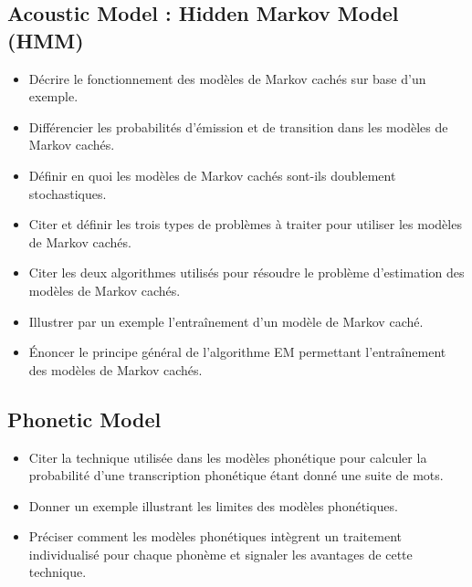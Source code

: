 \documentclass[letterpaper, 12pt]{article}
\begin{document}
	\subsection{Acoustic Model : Hidden Markov Model (HMM)}
		\begin{itemize}
			\setlength{\itemsep}{0pt}		
			\setlength{\parskip}{0pt}		
			\setlength{\parsep}{0pt}	
			\item Décrire le fonctionnement des modèles de Markov cachés sur base d'un exemple.
			\item Différencier les probabilités d'émission et de transition dans les modèles de Markov cachés.
			\item Définir en quoi les modèles de Markov cachés sont-ils doublement stochastiques.
			\item Citer et définir les trois types de problèmes à traiter pour utiliser les modèles de Markov cachés.
			\item Citer les deux algorithmes utilisés pour résoudre le problème d'estimation des modèles de 
				Markov cachés.
			\item Illustrer par un exemple l'entraînement d'un modèle de Markov caché.
			\item Énoncer le principe général de l'algorithme EM permettant l'entraînement des modèles de 
				Markov cachés.
		\end{itemize}
	\subsection{Phonetic Model}
		\begin{itemize}
			\setlength{\itemsep}{0pt}		
			\setlength{\parskip}{0pt}		
			\setlength{\parsep}{0pt}	
			\item Citer la technique utilisée dans les modèles phonétique pour calculer la probabilité 
				d'une transcription phonétique étant donné une suite de mots.
			\item Donner un exemple illustrant les limites des modèles phonétiques. 
			\item Préciser comment les modèles phonétiques intègrent un traitement individualisé pour chaque 
				phonème et signaler les avantages de cette technique.
		\end{itemize}
\end{document}
